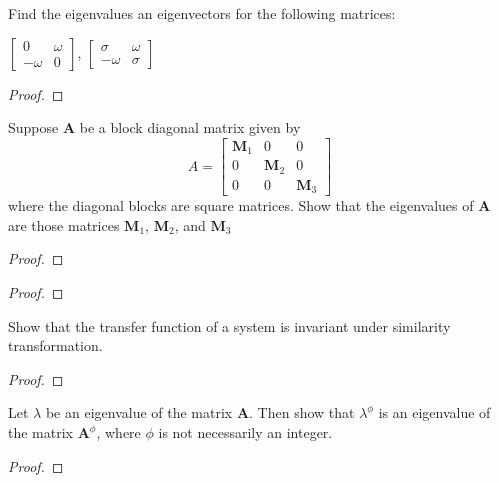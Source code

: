 \documentclass[conference,12pt,onecolumn,compsoc]{IEEEtran}
\begin{document}
\begin{exercise}
Find the eigenvalues an eigenvectors for the following matrices:
\begin{center}

$\begin{bmatrix} 0 & \omega \\ 
 -\omega & 0  \end{bmatrix}$, $\begin{bmatrix} \sigma & \omega  \\ 
 -\omega & \sigma  \end{bmatrix}$
\end{center}
\end{exercise}
\begin{proof}

\end{proof}

\begin{exercise}
Suppose \textbf{A} be a block diagonal matrix given by
\begin{equation}
A = \begin{bmatrix} \textbf{M}_1 & 0 & 0 \\ 
0 & \textbf{M}_2 & 0 \\ 
0 & 0 & \textbf{M}_3   \end{bmatrix}
\nonumber
\end{equation}
where the diagonal blocks are square matrices. Show that the eigenvalues of \textbf{A} are those matrices $\textbf{M}_1$, $\textbf{M}_2$, and $\textbf{M}_3$
\end{exercise}
\begin{proof}

\end{proof}

\begin{exercise}

\end{exercise}
\begin{proof}

\end{proof}

\begin{exercise}
Show that the transfer function of a system is invariant under similarity transformation.
\end{exercise}
\begin{proof}

\end{proof}

\begin{exercise}
Let $\lambda$ be an eigenvalue of the matrix $\textbf{A}$. Then show that $\lambda^\phi$ is an eigenvalue of the matrix $\textbf{A}^\phi$, where $\phi$ is not necessarily an integer.
\end{exercise}
\begin{proof}

\end{proof}


\end{document}
